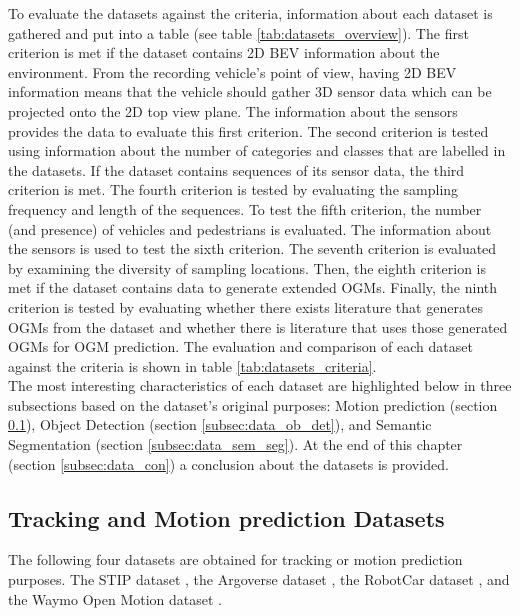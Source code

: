To evaluate the datasets against the criteria, information about each dataset is gathered and put into a table (see table \ref{tab:datasets_overview}). The first criterion is met if the dataset contains 2D \gls{BEV} information about the environment. From the recording vehicle's point of view, having 2D \gls{BEV} information means that the vehicle should gather 3D sensor data which can be projected onto the 2D top view plane. The information about the sensors provides the data to evaluate this first criterion. The second criterion is tested using information about the number of categories and classes that are labelled in the datasets. If the dataset contains sequences of its sensor data, the third criterion is met. The fourth criterion is tested by evaluating the sampling frequency and length of the sequences. To test the fifth criterion, the number (and presence) of vehicles and pedestrians is evaluated. The information about the sensors is used to test the sixth criterion. The seventh criterion is evaluated by examining the diversity of sampling locations. Then, the eighth criterion is met if the dataset contains data to generate extended \glspl{OGM}. Finally, the ninth criterion is tested by evaluating whether there exists literature that generates \glspl{OGM} from the dataset and whether there is literature that uses those generated \glspl{OGM} for \gls{OGM} prediction. The evaluation and comparison of each dataset against the criteria is shown in table \ref{tab:datasets_criteria}. \\

The most interesting characteristics of each dataset are highlighted below in three subsections based on the dataset's original purposes: Motion prediction (section \ref{subsec:data_track_mot}), Object Detection (section \ref{subsec:data_ob_det}), and Semantic Segmentation (section \ref{subsec:data_sem_seg}). At the end of this chapter (section \ref{subsec:data_con}) a conclusion about the datasets is provided.


\subsection{Tracking and Motion prediction Datasets} \label{subsec:data_track_mot}
The following four datasets are obtained for tracking or motion prediction purposes. The \gls{STIP} dataset \cite{liu2020spatiotemporal}, the Argoverse dataset \cite{chang2019argoverse}, the RobotCar dataset \cite{robotcardatasetijrr}, and the Waymo Open Motion dataset \cite{ettinger2021large}. \\


